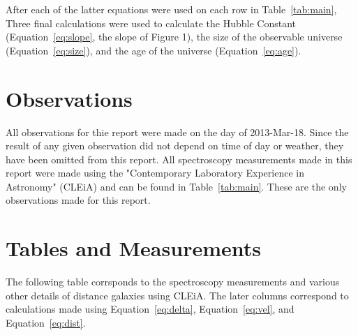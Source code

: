\documentclass{article}
\begin{document}
After each of the latter equations were used on each row in Table~\ref{tab:main},
Three final calculations were used to calculate the Hubble Constant
(Equation~\ref{eq:slope}, the slope of Figure 1), 
the size of the observable universe (Equation~\ref{eq:size}),
and the age of the universe (Equation~\ref{eq:age}).


\section{Observations}

All observations for thie report were made on the day of 2013-Mar-18. Since the result
of any given observation did not depend on time of day or weather, they have been
omitted from this report. All spectroscopy measurements made in this report were
made using the "Contemporary Laboratory Experience in Astronomy" (CLEiA) and can be
found in Table~\ref{tab:main}. These are the only observations made for this report.


\section{Tables and Measurements}

The following table corrsponds to the spectroscopy measurements and various other
details of distance galaxies using CLEiA. The later columns correspond to
calculations made using Equation~\ref{eq:delta}, Equation~\ref{eq:vel}, and
Equation~\ref{eq:dist}.
\end{document}
